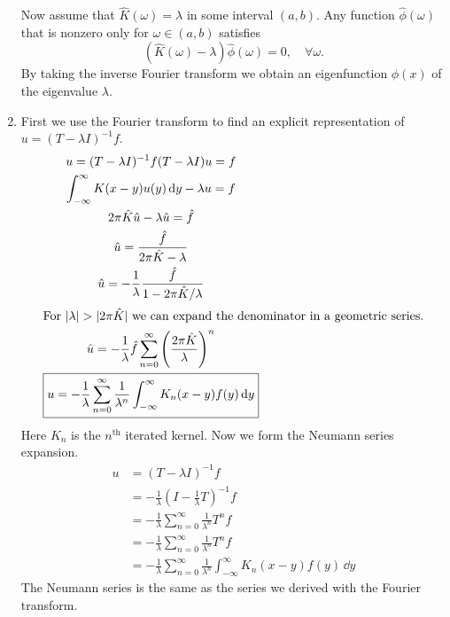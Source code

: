 \begin{Solution}
\begin{enumerate}
    Now assume that $\hat{K}(\omega) = \lambda$ in some interval $(a,b)$.  
    Any function $\hat{\phi}(\omega)$ that is nonzero only for 
    $\omega \in (a,b)$ satisfies
    \[
    \left( \hat{K}(\omega) - \lambda \right) \hat{\phi}(\omega) = 0, \quad
    \forall \omega.
    \]
    By taking the inverse Fourier transform we obtain an eigenfunction 
    $\phi(x)$ of the eigenvalue $\lambda$.
  \item
    First we use the Fourier transform to find an explicit representation of
    $u = (T - \lambda I)^{-1} f$.
    \begin{gather*}
      u = (T - \lambda I)^{-1} f
      (T - \lambda I) u = f \\
      \int_{-\infty}^\infty K(x - y) u(y) \,\mathrm{d} y - \lambda u = f \\
      2 \pi \hat{K} \hat{u} - \lambda \hat{u} = \hat{f} \\
      \hat{u} = \frac{ \hat{f} }{ 2 \pi \hat{K} - \lambda } \\
      \hat{u} = - \frac{1}{\lambda} \frac{ \hat{f} }{ 1 - 2 \pi \hat{K} / \lambda }\\
      \intertext{For $|\lambda| > |2 \pi \hat{K}|$ we can expand the denominator in 
        a geometric series.}
      \hat{u} = - \frac{1}{\lambda} \hat{f} 
      \sum_{n = 0}^\infty \left( \frac{ 2 \pi \hat{K} }{ \lambda } \right)^n \\
      \boxed{
        u = - \frac{1}{\lambda} \sum_{n = 0}^\infty \frac{1}{\lambda^n} 
        \int_{-\infty}^\infty K_n(x - y) f(y) \,\mathrm{d} y
        }
    \end{gather*}
    Here $K_n$ is the $n^{\mathrm{th}}$ iterated kernel.  
    Now we form the Neumann series expansion.
    \begin{align*}
      u       &= \left( T - \lambda I \right)^{-1} f \\
      &=  - \frac{1}{\lambda} \left( I - \frac{1}{\lambda} T \right)^{-1} f\\
      &=  - \frac{1}{\lambda} \sum_{n = 0}^\infty \frac{1}{\lambda^n} T^n f \\
      &=  - \frac{1}{\lambda} \sum_{n = 0}^\infty \frac{1}{\lambda^n} T^n f \\
      &=  - \frac{1}{\lambda} \sum_{n = 0}^\infty \frac{1}{\lambda^n} 
      \int_{-\infty}^\infty K_n(x - y) f(y) \,\dd y
    \end{align*}
    The Neumann series is the same as the series we derived with the 
    Fourier transform.
  \end{enumerate}
\end{Solution}



